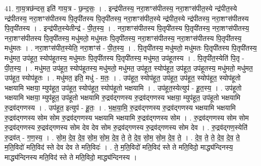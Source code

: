 \documentclass[17pt]{extarticle}
\begin{document}
41. गा॒य॒त्रछ॑न्दस॒ इति॑ गाय॒त्र - छ॒न्द॒सः॒ । . इन्द्र॑पीतस्य॒ नरा॒शꣳस॑पीतस्य॒ नरा॒शꣳस॑पीत॒स्ये न्द्र॑पीत॒स्ये न्द्र॑पीतस्य॒ नरा॒शꣳस॑पीतस्य पि॒तृपी॑तस्य पि॒तृपी॑तस्य॒ नरा॒शꣳस॑पीत॒स्ये न्द्र॑पीत॒स्ये न्द्र॑पीतस्य॒ नरा॒शꣳस॑पीतस्य पि॒तृपी॑तस्य । . इन्द्र॑पीत॒स्येतीन्द्र॑ - पी॒त॒स्य॒ । . नरा॒शꣳस॑पीतस्य पि॒तृपी॑तस्य पि॒तृपी॑तस्य॒ नरा॒शꣳस॑पीतस्य॒ नरा॒शꣳस॑पीतस्य पि॒तृपी॑तस्य॒ मधु॑मतो॒ मधु॑मतः पि॒तृपी॑तस्य॒ नरा॒शꣳस॑पीतस्य॒ नरा॒शꣳस॑पीतस्य पि॒तृपी॑तस्य॒ मधु॑मतः । . नरा॒शꣳस॑पीत॒स्येति॒ नरा॒शꣳस॑ - पी॒त॒स्य॒ । . पि॒तृपी॑तस्य॒ मधु॑मतो॒ मधु॑मतः पि॒तृपी॑तस्य पि॒तृपी॑तस्य॒ मधु॑मत॒ उप॑हूत॒ स्योप॑हूतस्य॒ मधु॑मतः पि॒तृपी॑तस्य पि॒तृपी॑तस्य॒ मधु॑मत॒ उप॑हूतस्य । . पि॒तृपी॑त॒स्येति॑ पि॒तृ - पी॒त॒स्य॒ । . मधु॑मत॒ उप॑हूत॒ स्योप॑हूतस्य॒ मधु॑मतो॒ मधु॑मत॒ उप॑हूत॒ स्योप॑हूत॒ उप॑हूत॒ उप॑हूतस्य॒ मधु॑मतो॒ मधु॑मत॒ उप॑हूत॒ स्योप॑हूतः । . मधु॑मत॒ इति॒ मधु॑ - म॒तः॒ । . उप॑हूत॒ स्योप॑हूत॒ उप॑हूत॒ उप॑हूत॒ स्योप॑हूत॒ स्योप॑हूतो भक्षयामि भक्षया॒ म्युप॑हूत॒ उप॑हूत॒ स्योप॑हूत॒ स्योप॑हूतो भक्षयामि । . उप॑हूत॒स्येत्युप॑ - हू॒त॒स्य॒ । . उप॑हूतो भक्षयामि भक्षया॒ म्युप॑हूत॒ उप॑हूतो भक्षयामि रु॒द्रव॑द्‍गणस्य रु॒द्रव॑द्‍गणस्य भक्षया॒ म्युप॑हूत॒ उप॑हूतो भक्षयामि रु॒द्रव॑द्‍गणस्य । . उप॑हूत॒ इत्युप॑ - हू॒तः॒ । . भ॒क्ष॒या॒मि॒ रु॒द्रव॑द्‍गणस्य रु॒द्रव॑द्‍गणस्य भक्षयामि भक्षयामि रु॒द्रव॑द्‍गणस्य सोम सोम रु॒द्रव॑द्‍गणस्य भक्षयामि भक्षयामि रु॒द्रव॑द्‍गणस्य सोम । . रु॒द्रव॑द्‍गणस्य सोम सोम रु॒द्रव॑द्‍गणस्य रु॒द्रव॑द्‍गणस्य सोम देव देव सोम रु॒द्रव॑द्‍गणस्य रु॒द्रव॑द्‍गणस्य सोम देव । . रु॒द्रव॑द्‍गण॒स्येति॑ रु॒द्रव॑त् - ग॒ण॒स्य॒ । . सो॒म॒ दे॒व॒ दे॒व॒ सो॒म॒ सो॒म॒ दे॒व॒ ते॒ ते॒ दे॒व॒ सो॒म॒ सो॒म॒ दे॒व॒ ते॒ । . दे॒व॒ ते॒ ते॒ दे॒व॒ दे॒व॒ ते॒ म॒ति॒विदो॑ मति॒विद॑ स्ते देव देव ते मति॒विदः॑ । . ते॒ म॒ति॒विदो॑ मति॒विद॑ स्ते ते मति॒विदो॒ माद्ध्य॑न्दिनस्य॒ माद्ध्य॑न्दिनस्य मति॒विद॑ स्ते ते मति॒विदो॒ माद्ध्य॑न्दिनस्य । \newline
\end{document}
